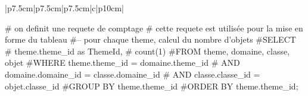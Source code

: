 \documentclass[12pt,titlepage]{book}
\begin{document}
\renewcommand{\arraystretch}{1.2}
\begin{supertabular}{|p{7.5cm}|p{7.5cm}|p{7.5cm}|c|p{10cm}|}

\begin{lbdpython}

# on definit une requete de comptage
# cette requete est utilisée pour la mise en forme du tableau
#-- pour chaque theme, calcul du nombre d'objets
#SELECT
#   theme.theme_id as ThemeId,
#   count(1)
#FROM theme, domaine, classe, objet
#WHERE theme.theme_id = domaine.theme_id 
#  AND domaine.domaine_id = classe.domaine_id
#  AND classe.classe_id = objet.classe_id
#GROUP BY theme.theme_id
#ORDER BY theme.theme_id;


\end{lbdpython}
\end{supertabular}
\end{document}
